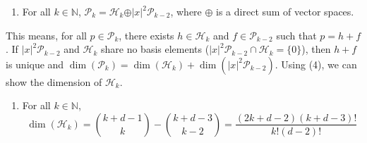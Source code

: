 \documentclass[12pt]{article}
\begin{document}
\begin{enumerate}[itemsep=0pt, topsep=0pt, parsep=0pt, partopsep=0pt]
\addtocounter{enumi}{3}
\item For all $k \in \mathbb{N}$, $\mathcal{P}_k = \mathcal{H}_k \oplus \vert x \vert^2 \mathcal{P}_{k-2}$, where $\oplus$ is a direct sum of vector spaces. \\
\end{enumerate}

\noindent  This means, for all $p \in \mathcal{P}_k$, there exists $h \in \mathcal{H}_k$ and $f \in \mathcal{P}_{k-2}$ such that $p = h + f$. If $\vert x \vert^2 \mathcal{P}_{k-2}$ and $\mathcal{H}_k$ share no basis elements ($\vert x \vert^2 \mathcal{P}_{k-2} \cap \mathcal{H}_k = \{0\}$), then $h+f$ is unique and 
$\dim(\mathcal{P}_k) = \dim(\mathcal{H}_k) + \dim(\vert x \vert^2 \mathcal{P}_{k-2})$. Using (4), we can show the dimension of $\mathcal{H}_k$. \\

\begin{enumerate}[itemsep=0pt, topsep=0pt, parsep=0pt, partopsep=0pt]
\addtocounter{enumi}{4}
\item For all $k \in \mathbb{N}$, 
$$\dim(\mathcal{H}_k) = \binom{k+d-1}{k} - \binom{k+d-3}{k-2} = \frac{(2k+d-2)(k+d-3)!}{k!(d-2)!}$$
\end{enumerate}
\end{document}
